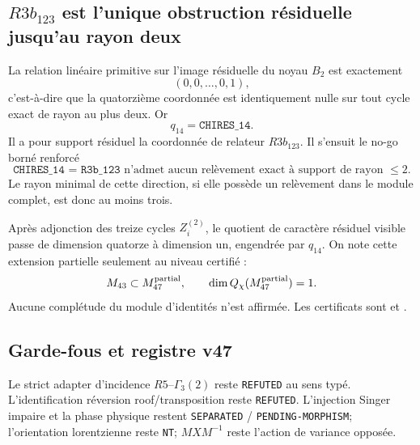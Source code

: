 \documentclass[11pt,a4paper]{article}
\newcommand{\certRefuted}{\texttt{REFUTED}}
\newcommand{\certSeparated}{\texttt{SEPARATED}}
\newcommand{\certPending}{\texttt{PENDING-MORPHISM}}
\newcommand{\certNT}{\texttt{NT}}
\begin{document}
\subsection{$R3b_{123}$ est l'unique obstruction résiduelle jusqu'au rayon deux}

La relation linéaire primitive sur l'image résiduelle du noyau $B_2$ est exactement
\[
 \boxed{(0,0,\ldots,0,1)},
\]
c'est-à-dire que la quatorzième coordonnée est identiquement nulle sur tout cycle exact de rayon au plus deux. Or
\[
 q_{14}=\texttt{CHIRES\_14}.
\]
Il a pour support résiduel la coordonnée de relateur $R3b_{123}$. Il s'ensuit le no-go borné renforcé
\[
 \boxed{
 \texttt{CHIRES\_14 = R3b\_123}
 \text{ n'admet aucun relèvement exact à support de rayon }\le2.}
\]
Le rayon minimal de cette direction, si elle possède un relèvement dans le module complet, est donc au moins trois.

Après adjonction des treize cycles $Z_i^{(2)}$, le quotient de caractère résiduel visible passe de dimension quatorze à dimension un, engendrée par $q_{14}$. On note cette extension partielle seulement au niveau certifié :
\[
 M_{43}\subset M_{47}^{\rm partial},
 \qquad
 \dim Q_\chi(M_{47}^{\rm partial})=1.
\]
Aucune complétude du module d'identités n'est affirmée. Les certificats sont  et .

\subsection{Garde-fous et registre v47}

Le strict adapter d'incidence $R5$--$\Gamma_3(2)$ reste \certRefuted{} au sens typé. L'identification réversion roof/transposition reste \certRefuted{}. L'injection Singer impaire et la phase physique restent \certSeparated{} / \certPending; l'orientation lorentzienne reste \certNT{}; $MXM^{-1}$ reste l'action de variance opposée.
\end{document}
